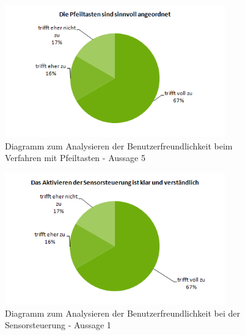 \begin{figure}[H]
	\centering
		\includegraphics[width=0.85\textwidth]{03_Grafiken/Anhang/UsabilityDiagramme/Aufgabenteil3Aussage5.png}
	\caption[Diagramm zum Analysieren der Benutzerfreundlichkeit beim Verfahren mit Pfeiltasten - Aussage 5]{Diagramm zum Analysieren der Benutzerfreundlichkeit beim Verfahren mit Pfeiltasten - Aussage 5}
	\label{fig:Aufgabenteil3Aussage5}
\end{figure}
\begin{figure}[H]
	\centering
		\includegraphics[width=0.85\textwidth]{03_Grafiken/Anhang/UsabilityDiagramme/Aufgabenteil4Aussage1.png}
	\caption[Diagramm zum Analysieren der Benutzerfreundlichkeit bei der Sensorsteuerung - Aussage 1]{Diagramm zum Analysieren der Benutzerfreundlichkeit bei der Sensorsteuerung - Aussage 1}
	\label{fig:Aufgabenteil4Aussage1}
\end{figure}
